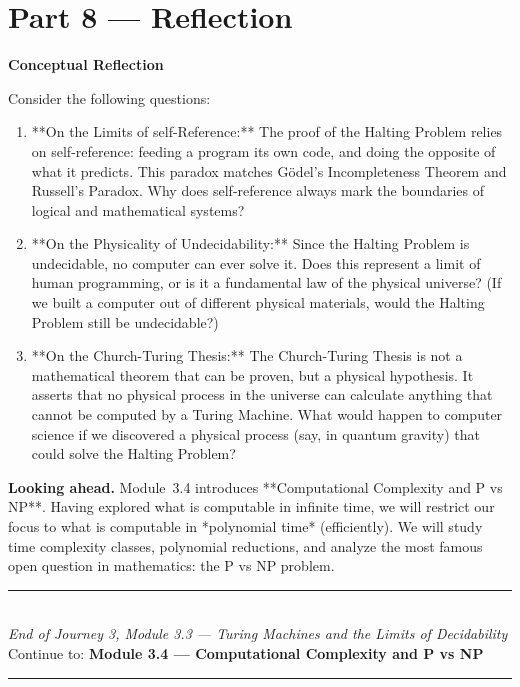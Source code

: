 \documentclass[12pt, a4paper]{book}
\begin{document}
\newpage

\section{Part 8 --- Reflection}

\begin{reflectionbox}
\textbf{Conceptual Reflection}

Consider the following questions:
\begin{enumerate}
  \item **On the Limits of self-Reference:** The proof of the Halting Problem relies on self-reference: feeding a program its own code, and doing the opposite of what it predicts. This paradox matches Gödel's Incompleteness Theorem and Russell's Paradox. Why does self-reference always mark the boundaries of logical and mathematical systems?
  \item **On the Physicality of Undecidability:** Since the Halting Problem is undecidable, no computer can ever solve it. Does this represent a limit of human programming, or is it a fundamental law of the physical universe? (If we built a computer out of different physical materials, would the Halting Problem still be undecidable?)
  \item **On the Church-Turing Thesis:** The Church-Turing Thesis is not a mathematical theorem that can be proven, but a physical hypothesis. It asserts that no physical process in the universe can calculate anything that cannot be computed by a Turing Machine. What would happen to computer science if we discovered a physical process (say, in quantum gravity) that could solve the Halting Problem?
\end{enumerate}
\end{reflectionbox}

\medskip
\noindent\textbf{Looking ahead.}
Module~3.4 introduces **Computational Complexity and P vs NP**. Having explored what is computable in infinite time, we will restrict our focus to what is computable in *polynomial time* (efficiently). We will study time complexity classes, polynomial reductions, and analyze the most famous open question in mathematics: the P vs NP problem.

\vspace{1.4cm}
\begin{center}
{\color{JourneyColor}\rule{0.5\linewidth}{0.8pt}}\\[6pt]
{\small\color{JourneyColor}\textit{End of Journey 3, Module 3.3 --- Turing Machines and the Limits of Decidability}}\\[4pt]
{\small\color{JourneyColor}Continue to: \textbf{Module 3.4 --- Computational Complexity and P vs NP}}\\[6pt]
{\color{JourneyColor}\rule{0.5\linewidth}{0.8pt}}
\end{center}
\end{document}
